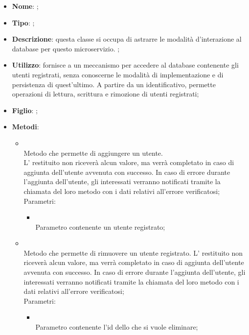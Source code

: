 \begin{itemize}
	\item \textbf{Nome}: ;
	\item \textbf{Tipo}: ;
	\item \textbf{Descrizione}: questa classe si occupa di astrarre le modalità d'interazione al database per questo microservizio. ;
	\item \textbf{Utilizzo}: fornisce a  un meccanismo per accedere al database contenente gli utenti registrati, senza conoscerne le modalità di implementazione e di persistenza di quest'ultimo.
A partire da un identificativo, permette operazioni di lettura, scrittura e rimozione di utenti registrati;
	\item \textbf{Figlio}: ;
	\item \textbf{Metodi}:
	\begin{itemize}
		\item[]  \\
		Metodo che permette di aggiungere un utente. \\
L' restituito non riceverà alcun valore, ma verrà completato in caso di aggiunta dell'utente avvenuta con successo. In caso di errore durante l'aggiunta dell'utente, gli  interessati verranno notificati tramite la chiamata del loro metodo  con i dati relativi all'errore verificatosi;\\
		Parametri:
		\begin{itemize}
			\item {} \\
			Parametro contenente un utente registrato;
		\end{itemize}
		\item[]  \\
		Metodo che permette di rimuovere un utente registrato. L' restituito non riceverà alcun valore, ma verrà completato in caso di aggiunta dell'utente avvenuta con successo. In caso di errore durante l'aggiunta dell'utente, gli  interessati verranno notificati tramite la chiamata del loro metodo  con i dati relativi all'errore verificatosi;\\
		Parametri:
		\begin{itemize}
			\item {} \\
			Parametro contenente l'id dello  che si vuole eliminare;

\end{itemize}
\end{itemize}
\end{itemize}
